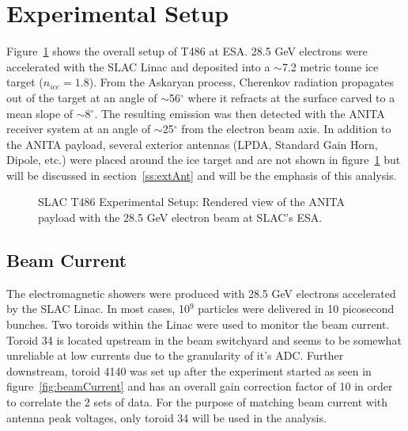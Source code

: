 \section{Experimental Setup}
\label{s:slacSetup}
Figure~\ref{fig:slacExpSetup} shows the overall setup of T486 at ESA.  28.5 GeV electrons were accelerated with the SLAC Linac and deposited into a $\sim$7.2 metric tonne ice target ($n_{ice} = 1.8$).  From the Askaryan process, Cherenkov radiation propagates out of the target at an angle of $\sim$56$^\circ$ where it refracts at the surface carved to a mean slope of $\sim$8$^\circ$.  The resulting emission was then detected with the ANITA receiver system at an angle of $\sim$25$^\circ$ from the electron beam axis.  In addition to the ANITA payload, several exterior antennas (LPDA, Standard Gain Horn, Dipole, etc.) were placed around the ice target and are not shown in figure~\ref{fig:slacExpSetup} but will be discussed in section~\ref{ss:extAnt} and will be the emphasis of this analysis.
\begin{figure}[htbp]
\centering
\epsfxsize=4.0in
\caption{SLAC T486 Experimental Setup:  Rendered view of the ANITA payload with the 28.5 GeV electron beam at SLAC's ESA.}
\label{fig:slacExpSetup}
\end{figure}
%
\subsection{Beam Current}
\label{ss:beamCurrent}
The electromagnetic showers were produced with 28.5 GeV electrons accelerated by the SLAC Linac.  In most cases, 10$^9$ particles were delivered in 10 picosecond bunches.  Two toroids within the Linac were used to monitor the beam current.  Toroid 34 is located upstream in the beam switchyard and seems to be somewhat unreliable at low currents due to the granularity of it's ADC.  Further downstream, toroid 4140 was set up after the experiment started as seen in figure~\ref{fig:beamCurrent} and has an overall gain correction factor of 10 in order to correlate the 2 sets of data.  For the purpose of matching beam current with antenna peak voltages, only toroid 34 will be used in the analysis.

